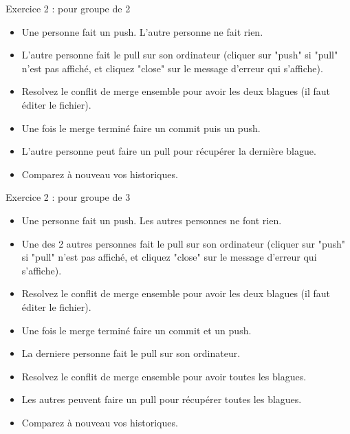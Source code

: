 \documentclass{beamer}
\begin{document}
\begin{frame}{Exercice 2 : pour groupe de 2}
    \begin{itemize}
        \item Une personne fait un push. L'autre personne ne fait rien.
        \item L'autre personne fait le pull sur son ordinateur
            (cliquer sur "push" si "pull" n'est pas affiché, et cliquez "close" sur le message d'erreur qui s'affiche).
        \item Resolvez le conflit de merge ensemble pour avoir les deux blagues (il faut éditer le fichier).
        \item Une fois le merge terminé faire un commit puis un push.
        \item L'autre personne peut faire un pull pour récupérer la dernière blague.
        \item Comparez à nouveau vos historiques.
    \end{itemize}
\end{frame}

\begin{frame}{Exercice 2 : pour groupe de 3}
    \begin{itemize}
        \item Une personne fait un push. Les autres personnes ne font rien.
        \item Une des 2 autres personnes fait le pull sur son ordinateur
            (cliquer sur "push" si "pull" n'est pas affiché, et cliquez "close" sur le message d'erreur qui s'affiche).
        \item Resolvez le conflit de merge ensemble pour avoir les deux blagues (il faut éditer le fichier).
        \item Une fois le merge terminé faire un commit et un push.
        \item La derniere personne fait le pull sur son ordinateur.
        \item Resolvez le conflit de merge ensemble pour avoir toutes les blagues.
        \item Les autres peuvent faire un pull pour récupérer toutes les blagues.
        \item Comparez à nouveau vos historiques.
    \end{itemize}
\end{frame}
\end{document}
